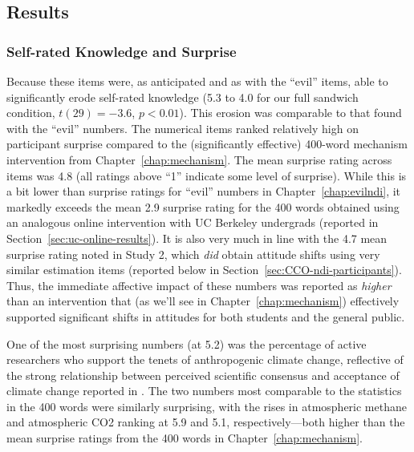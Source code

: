 % 

\subsection{Results}

\subsubsection{Self-rated Knowledge and Surprise}

Because these items were, as anticipated and as with the “evil” items, able to
significantly erode self-rated knowledge (5.3 to 4.0 for our full sandwich
condition, $t(29)=-3.6$, $p<0.01$).  This erosion was comparable to that found
with the “evil” numbers.  The numerical items ranked relatively high on
participant surprise compared to the (significantly effective) 400-word
mechanism intervention from Chapter~\ref{chap:mechanism}.  The mean surprise
rating across items was 4.8 (all ratings above “1” indicate some level of
surprise).  While this is a bit lower than surprise ratings for “evil” numbers
in Chapter~\ref{chap:evilndi}, it markedly exceeds the mean 2.9 surprise rating
for the 400 words obtained using an analogous online intervention with UC
Berkeley undergrads (reported in Section~\ref{sec:uc-online-results}). It is
also very much in line with the 4.7 mean surprise rating noted in Study 2, which
\emph{did} obtain attitude shifts using very similar estimation items (reported
below in Section~\ref{sec:CCO-ndi-participants}). Thus, the immediate affective
impact of these numbers was reported as \emph{higher} than an intervention that
(as we'll see in Chapter~\ref{chap:mechanism}) effectively supported significant
shifts in attitudes for both students and the general public.

One of the most surprising numbers (at 5.2) was the percentage of active
researchers who support the tenets of anthropogenic climate change, reflective
of the strong relationship between perceived scientific consensus and acceptance
of climate change reported in \textcite{lewandowsky_pivotal_2013}. The two
numbers most comparable to the statistics in the 400 words were similarly
surprising, with the rises in atmospheric methane and atmospheric CO2 ranking at
5.9 and 5.1, respectively---both higher than the mean surprise ratings from the
400 words in Chapter~\ref{chap:mechanism}.


